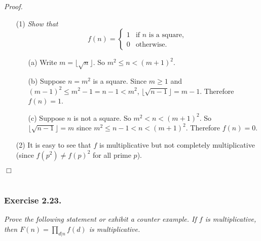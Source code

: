 \documentclass{article}
\begin{document}
\emph{Proof.}
\begin{enumerate}
\item[(1)]
  \emph{Show that}
  \begin{equation*}
    f(n) =
    \begin{cases}
      1 & \text{if $n$ is a square}, \\
      0 & \text{otherwise}.
    \end{cases}
  \end{equation*}
  \begin{enumerate}
  \item[(a)]
    Write $m = \lfloor \sqrt{n} \rfloor$. So $m^2 \leq n < (m+1)^2$.

  \item[(b)]
    Suppose $n = m^2$ is a square.
    Since $m \geq 1$ and $(m-1)^2 \leq m^2 - 1 = n - 1 < m^2$,
    $\lfloor \sqrt{n-1} \rfloor = m - 1$.
    Therefore $f(n) = 1$.

  \item[(c)]
    Suppose $n$ is not a square.
    So $m^2 < n < (m+1)^2$.
    So $\lfloor \sqrt{n-1} \rfloor = m$ since $m^2 \leq n - 1 < n < (m+1)^2$.
    Therefore $f(n) = 0$.
  \end{enumerate}

\item[(2)]
  It is easy to see that $f$ is multiplicative but not completely multiplicative
  (since $f(p^2) \neq f(p)^2$ for all prime $p$).
\end{enumerate}
$\Box$ \\\\









\subsubsection*{Exercise 2.23.}
\emph{Prove the following statement or exhibit a counter example.
If $f$ is multiplicative, then $F(n) = \prod_{d|n} f(d)$ is multiplicative.} \\
\end{document}
